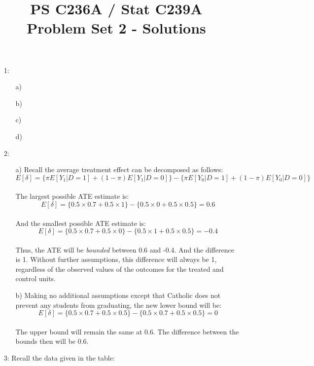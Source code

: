 \documentclass{article}
\title{PS C236A / Stat C239A \\ Problem Set 2 - Solutions}
\date{}
\begin{document}
\maketitle
\begin{itemize}
\item[1:]
\begin{itemize}
\item[a)]   
\item[b)] 
\item[c)]  
\item[d)]  
\end{itemize}


\item[2:]  
\begin{itemize}
\item[a)] Recall the average treatment effect can be decomposed as follows: 
$$E[\delta] = \{\pi E[Y_1 | D =1] + (1-\pi)E[Y_1|D=0] \} - \{\pi E[Y_0
| D =1] + (1-\pi)E[Y_0|D=0] \}$$\\
The largest possible ATE estimate is: 
$$E[\delta]  =\{0.5 \times 0.7 + 0.5 \times 1\} - \{0.5 \times 0 + 0.5 \times 0.5\} = 0.6$$ \\
And the smallest possible ATE estimate is: 
$$E[\delta]  =\{0.5 \times 0.7 + 0.5 \times 0\} - \{0.5 \times 1 + 0.5
\times 0.5\} = -0.4$$ \\
Thus, the ATE will be {\em bounded} between 0.6 and -0.4. And the
difference is 1.  Without further assumptions, this difference will
always be 1, regardless of the observed values of the outcomes for
the treated and control units.
\item[b)] Making no additional assumptions except that Catholic does
  not prevent any students from graduating, the new lower bound will
  be: 
$$E[\delta]  =\{0.5 \times 0.7 + 0.5 \times 0.5\} - \{0.5 \times 0.7 + 0.5
\times 0.5\} = 0$$ \\
The upper bound will remain the same at 0.6. The difference between the bounds then will be 0.6.

\end{itemize}

\item[3:] Recall the data given in the table:


\end{itemize}
\end{document}
